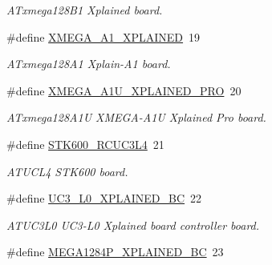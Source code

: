 \begin{DoxyCompactItemize}
\begin{DoxyCompactList}\small\item\em A\+Txmega128\+B1 Xplained board. \end{DoxyCompactList}\item 
\hypertarget{group__group__common__boards_gae79074f51491bf88c25efd857b92cbd4}{}\#define \hyperlink{group__group__common__boards_gae79074f51491bf88c25efd857b92cbd4}{X\+M\+E\+G\+A\+\_\+\+A1\+\_\+\+X\+P\+L\+A\+I\+N\+E\+D}~19\label{group__group__common__boards_gae79074f51491bf88c25efd857b92cbd4}

\begin{DoxyCompactList}\small\item\em A\+Txmega128\+A1 Xplain-\/\+A1 board. \end{DoxyCompactList}\item 
\hypertarget{group__group__common__boards_ga966caec7a287f05d293e525b0ee0ee4d}{}\#define \hyperlink{group__group__common__boards_ga966caec7a287f05d293e525b0ee0ee4d}{X\+M\+E\+G\+A\+\_\+\+A1\+U\+\_\+\+X\+P\+L\+A\+I\+N\+E\+D\+\_\+\+P\+R\+O}~20\label{group__group__common__boards_ga966caec7a287f05d293e525b0ee0ee4d}

\begin{DoxyCompactList}\small\item\em A\+Txmega128\+A1\+U X\+M\+E\+G\+A-\/\+A1\+U Xplained Pro board. \end{DoxyCompactList}\item 
\hypertarget{group__group__common__boards_ga8eec8cd16b9138bb1117e9381138a3fc}{}\#define \hyperlink{group__group__common__boards_ga8eec8cd16b9138bb1117e9381138a3fc}{S\+T\+K600\+\_\+\+R\+C\+U\+C3\+L4}~21\label{group__group__common__boards_ga8eec8cd16b9138bb1117e9381138a3fc}

\begin{DoxyCompactList}\small\item\em A\+T\+U\+C\+L4 S\+T\+K600 board. \end{DoxyCompactList}\item 
\hypertarget{group__group__common__boards_gab872a6d2f79f1bbb274b5f9fff4b855f}{}\#define \hyperlink{group__group__common__boards_gab872a6d2f79f1bbb274b5f9fff4b855f}{U\+C3\+\_\+\+L0\+\_\+\+X\+P\+L\+A\+I\+N\+E\+D\+\_\+\+B\+C}~22\label{group__group__common__boards_gab872a6d2f79f1bbb274b5f9fff4b855f}

\begin{DoxyCompactList}\small\item\em A\+T\+U\+C3\+L0 U\+C3-\/\+L0 Xplained board controller board. \end{DoxyCompactList}\item 
\hypertarget{group__group__common__boards_ga9acdb5a6b5436d3bf40bdfa8c1338152}{}\#define \hyperlink{group__group__common__boards_ga9acdb5a6b5436d3bf40bdfa8c1338152}{M\+E\+G\+A1284\+P\+\_\+\+X\+P\+L\+A\+I\+N\+E\+D\+\_\+\+B\+C}~23\label{group__group__common__boards_ga9acdb5a6b5436d3bf40bdfa8c1338152}


\end{DoxyCompactItemize}

